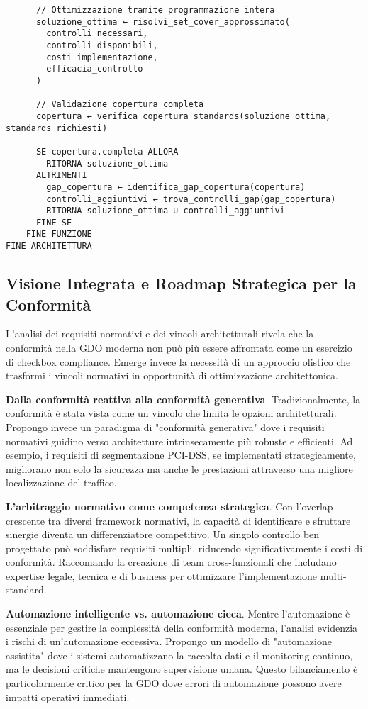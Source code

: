 {{\begin{verbatim}
      // Ottimizzazione tramite programmazione intera
      soluzione_ottima ← risolvi_set_cover_approssimato(
        controlli_necessari,
        controlli_disponibili,
        costi_implementazione,
        efficacia_controllo
      )
      
      // Validazione copertura completa
      copertura ← verifica_copertura_standards(soluzione_ottima, standards_richiesti)
      
      SE copertura.completa ALLORA
        RITORNA soluzione_ottima
      ALTRIMENTI
        gap_copertura ← identifica_gap_copertura(copertura)
        controlli_aggiuntivi ← trova_controlli_gap(gap_copertura)
        RITORNA soluzione_ottima ∪ controlli_aggiuntivi
      FINE SE
    FINE FUNZIONE
FINE ARCHITETTURA
\end{verbatim}

\subsection{Visione Integrata e Roadmap Strategica per la Conformità}

L'analisi dei requisiti normativi e dei vincoli architetturali rivela che la conformità nella GDO moderna non può più essere affrontata come un esercizio di checkbox compliance. Emerge invece la necessità di un approccio olistico che trasformi i vincoli normativi in opportunità di ottimizzazione architettonica.

\textbf{Dalla conformità reattiva alla conformità generativa}. Tradizionalmente, la conformità è stata vista come un vincolo che limita le opzioni architetturali. Propongo invece un paradigma di "conformità generativa" dove i requisiti normativi guidino verso architetture intrinsecamente più robuste e efficienti. Ad esempio, i requisiti di segmentazione PCI-DSS, se implementati strategicamente, migliorano non solo la sicurezza ma anche le prestazioni attraverso una migliore localizzazione del traffico.

\textbf{L'arbitraggio normativo come competenza strategica}. Con l'overlap crescente tra diversi framework normativi, la capacità di identificare e sfruttare sinergie diventa un differenziatore competitivo. Un singolo controllo ben progettato può soddisfare requisiti multipli, riducendo significativamente i costi di conformità. Raccomando la creazione di team cross-funzionali che includano expertise legale, tecnica e di business per ottimizzare l'implementazione multi-standard.

\textbf{Automazione intelligente vs. automazione cieca}. Mentre l'automazione è essenziale per gestire la complessità della conformità moderna, l'analisi evidenzia i rischi di un'automazione eccessiva. Propongo un modello di "automazione assistita" dove i sistemi automatizzano la raccolta dati e il monitoring continuo, ma le decisioni critiche mantengono supervisione umana. Questo bilanciamento è particolarmente critico per la GDO dove errori di automazione possono avere impatti operativi immediati.

}}
